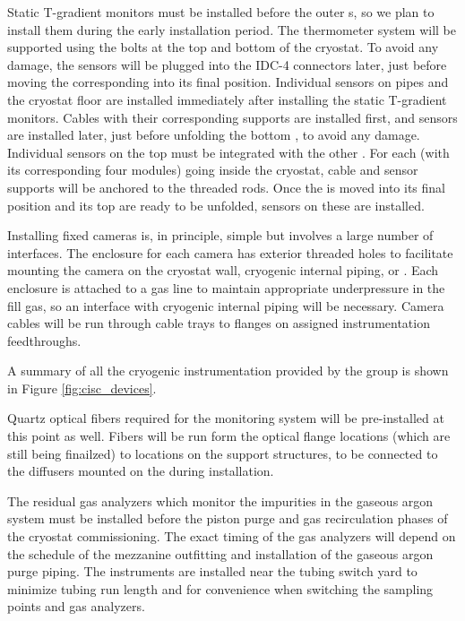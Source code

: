 Static T-gradient monitors must be installed before the outer s, so we plan to install them during the early installation period. The thermometer system will be supported using the bolts at the top and bottom of the cryostat. To avoid any damage, the sensors will be plugged into the IDC-4 connectors later, just before moving the corresponding  into its final position. Individual sensors on pipes and the cryostat floor are installed immediately after installing the static T-gradient monitors. Cables with their corresponding supports are installed first, and sensors are installed later, just before unfolding the bottom , to avoid any damage. Individual sensors on the top  must be integrated with the other . For each  (with its corresponding four  modules) going inside the cryostat, cable and sensor supports will be anchored to the  threaded rods. Once the  is moved into its final position and its top  are ready to be unfolded, sensors on these  are installed.

Installing fixed cameras is, in principle, simple but involves a large number of interfaces. The enclosure for each camera has exterior threaded holes to facilitate mounting the camera on the cryostat wall, cryogenic internal piping, or . Each enclosure is attached to a gas line to maintain appropriate underpressure in the fill gas, so an interface with cryogenic internal piping will be necessary. Camera cables will be run through cable trays to flanges on assigned instrumentation feedthroughs. 

A summary of all the cryogenic instrumentation provided by the  group is shown in Figure \ref{fig:cisc_devices}. 

Quartz optical fibers required for the  monitoring system will be pre-installed at this point as well.  Fibers will be run form the optical flange locations (which are still being finailzed) to locations on the  support structures, to be connected to the diffusers mounted on the  during installation.

The residual gas analyzers which monitor the impurities in the gaseous argon system must be installed before the piston purge and gas recirculation phases of the cryostat commissioning. The exact timing of the gas analyzers will depend on the schedule of the mezzanine outfitting and installation of the gaseous argon purge piping. The instruments are installed near the tubing switch yard to minimize tubing run length and for convenience when switching the sampling points and gas analyzers. 

